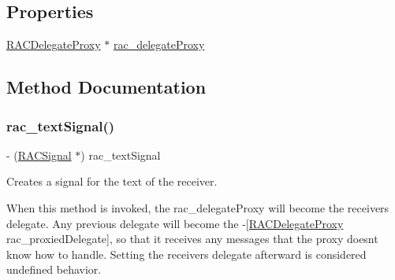 \subsection*{Properties}
\begin{DoxyCompactItemize}
\item 
\mbox{\hyperlink{interface_r_a_c_delegate_proxy}{R\+A\+C\+Delegate\+Proxy}} $\ast$ \mbox{\hyperlink{category_u_i_text_view_07_r_a_c_signal_support_08_a7bb09ed468da0a4a9e4691b2301fddd7}{rac\+\_\+delegate\+Proxy}}
\end{DoxyCompactItemize}


\subsection{Method Documentation}
\mbox{\label{category_u_i_text_view_07_r_a_c_signal_support_08_aad510c683b60bb5788035a21f860690d}} 
\subsubsection{\texorpdfstring{rac\+\_\+text\+Signal()}{rac\_textSignal()}\hspace{0.1cm}{\footnotesize\ttfamily [1/3]}}
{\footnotesize\ttfamily -\/ (\mbox{\hyperlink{interface_r_a_c_signal}{R\+A\+C\+Signal}} $\ast$) rac\+\_\+text\+Signal \begin{DoxyParamCaption}{ }\end{DoxyParamCaption}}

Creates a signal for the text of the receiver.

When this method is invoked, the {\ttfamily rac\+\_\+delegate\+Proxy} will become the receiver\textquotesingle{}s delegate. Any previous delegate will become the -\/\mbox{[}\mbox{\hyperlink{interface_r_a_c_delegate_proxy}{R\+A\+C\+Delegate\+Proxy}} rac\+\_\+proxied\+Delegate\mbox{]}, so that it receives any messages that the proxy doesn\textquotesingle{}t know how to handle. Setting the receiver\textquotesingle{}s {\ttfamily delegate} afterward is considered undefined behavior.

